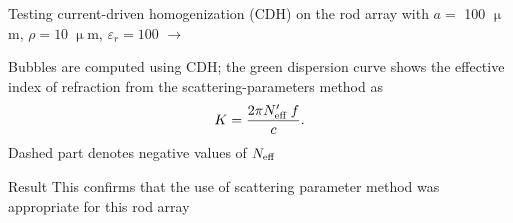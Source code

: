 \documentclass[t]{beamer} \usepackage[english]{babel} \usepackage[utf8]{inputenc} \usetheme{Frankfurt} %
\begin{document}
\begin{frame}[plain]{}%
\begin{columns}[T] %
	\begin{column}{.55\textwidth}
	\vspace{3mm}
	\noindent Testing current-driven homogenization (CDH) on the rod array with $a=$ 100 $\upmu$m, $\rho=10\;\upmu$m, $\varepsilon_r=100$ 	$\rightarrow$
	\vspace{3mm}

	\noindent Bubbles are computed using CDH; the green dispersion curve shows the effective index of refraction from the scattering-parameters method as $$K = \frac{2\pi N_{\text{eff} }' \;f}{c}.$$ Dashed part denotes negative values of $N_{\text{eff} }$
	\vspace{3mm}
	\begin{exampleblock}{Result}
	\noindent This confirms that the use of scattering parameter method was appropriate for this rod array
	\end{exampleblock}


\end{column}
\end{columns}
\end{frame}
\end{document}
